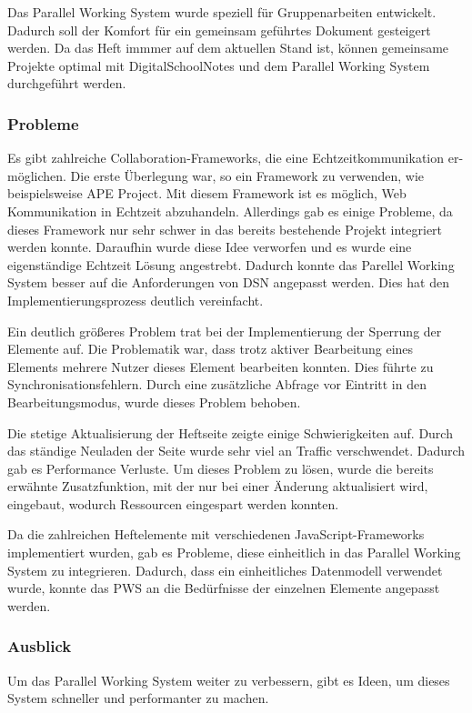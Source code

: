 Das Parallel Working System wurde speziell für Gruppenarbeiten entwickelt. Dadurch soll der Komfort für ein gemeinsam geführtes Dokument gesteigert werden. Da das Heft immmer auf dem aktuellen Stand ist, können gemeinsame Projekte optimal mit DigitalSchoolNotes und dem Parallel Working System  durchgeführt werden. 
 
\subsubsection{Probleme}
Es gibt zahlreiche Collaboration-Frameworks, die eine Echtzeitkommunikation er-\\möglichen. Die erste Überlegung war, so ein Framework zu verwenden, wie beispielsweise APE Project\cite{APE}. Mit diesem Framework ist es möglich, Web Kommunikation in Echtzeit abzuhandeln. Allerdings gab es einige Probleme, da dieses Framework nur sehr schwer in das bereits bestehende Projekt integriert werden konnte. Daraufhin wurde diese Idee verworfen und es wurde eine eigenständige Echtzeit Lösung angestrebt. Dadurch konnte das Parellel Working System besser auf die Anforderungen von DSN angepasst werden. Dies hat den Implementierungsprozess deutlich vereinfacht.

Ein deutlich größeres Problem trat bei der Implementierung der Sperrung der Elemente auf. Die Problematik war, dass trotz aktiver Bearbeitung eines Elements mehrere Nutzer dieses Element bearbeiten konnten. Dies führte zu Synchronisationsfehlern. Durch eine zusätzliche Abfrage vor Eintritt in den Bearbeitungsmodus, wurde dieses Problem behoben. 

Die stetige Aktualisierung der Heftseite zeigte einige Schwierigkeiten auf. Durch das ständige Neuladen der Seite wurde sehr viel an Traffic verschwendet. Dadurch gab es Performance Verluste. Um dieses Problem zu lösen, wurde die bereits erwähnte Zusatzfunktion, mit der nur bei einer Änderung aktualisiert wird, eingebaut, wodurch Ressourcen eingespart werden konnten.

Da die zahlreichen Heftelemente mit verschiedenen JavaScript-Frameworks implementiert wurden, gab es Probleme, diese einheitlich in das Parallel Working System zu integrieren. Dadurch, dass ein einheitliches Datenmodell verwendet wurde, konnte das PWS an die Bedürfnisse der einzelnen Elemente angepasst werden. 
\subsubsection{Ausblick}
Um das Parallel Working System weiter zu verbessern, gibt es Ideen, um dieses System schneller und performanter zu machen.

